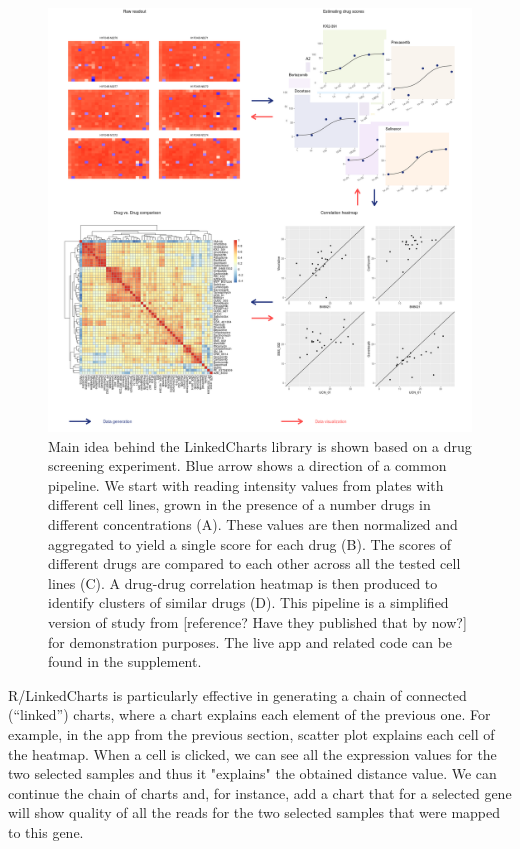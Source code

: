 \documentclass[twocolumn,10pt]{article}
\begin{document}
\begin{figure}
	\includegraphics[width=\textwidth]{FigC/figC.png}
	\caption{Main idea behind the LinkedCharts library is shown based on a drug screening experiment. Blue arrow shows a direction of a common pipeline. We start with reading intensity values from plates with different cell lines, grown in the presence of a number drugs in different concentrations (A). These values are then normalized and aggregated to yield a single score for each drug (B). The scores of different drugs are compared to each other across all the tested cell lines (C). A drug-drug correlation heatmap is then produced to identify clusters of similar drugs (D). This pipeline is a simplified version of study from [reference? Have they published that by now?] for demonstration purposes. The live app and related code can be found in the supplement.}
	\label{FigC}
\end{figure}

R/LinkedCharts is particularly effective in generating a chain of connected (``linked'') charts, where a chart explains each element of the previous one. For example, in the app from the previous section, scatter plot explains each cell of the heatmap. When a cell is clicked, we can see all the expression values for the two selected samples and thus it "explains" the obtained distance value. We can continue the chain of charts and, for instance, add a chart that for a selected gene will show quality of all the reads for the two selected samples that were mapped to this gene.
\end{document}
